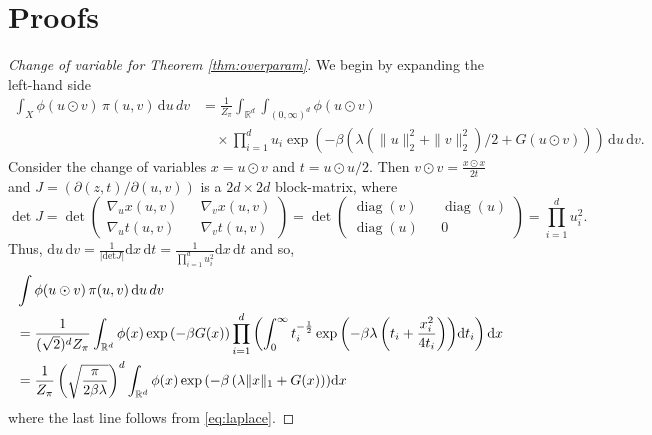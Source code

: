 \documentclass{article}
\DeclareMathOperator*{\diag}{diag}
\begin{document}
\section{Proofs}
\begin{proof}[Change of variable for Theorem \ref{thm:overparam}]
We begin by expanding the left-hand side
    \begin{align*}
    \int_X \phi(u \odot v) \,\pi(u,v)\,\mathrm{d}u\,dv &= \frac{1}{Z_\pi}  \int_{\mathbb{R}^d} \int_{(0,\infty)^d} \phi(u \odot v) \\
    &\quad\times\prod_{i=1}^d u_{i} \exp{ \left(-\beta \left(\lambda (\|u\|_2^2 + \|v\|_2^2)/2 + G(u \odot v) \right) \right)}\, \mathrm{d}u \,\mathrm{d}v.
    \end{align*}
    Consider the change of variables $x = u \odot v$ and $t = u \odot u/2$. Then $v \odot v = \frac{x \odot x}{2t}$ and $J = (\partial(z,t) / \partial(u,v))$ is a $2d \times 2d$ block-matrix, where
    $$\operatorname{det}J 
    = 
    \operatorname{det}\begin{pmatrix}
     \nabla_u x(u,v) && \nabla_v x(u,v) \\
     \nabla_u t(u,v) && \nabla_v t(u,v)
    \end{pmatrix} =\operatorname{det}\begin{pmatrix}
     \diag(v) && \diag(u) \\
     \diag(u) && 0
    \end{pmatrix} = \prod_{i=1}^d u_i^2.$$ 
    Thus, $\mathrm{d}u\,\mathrm{d}v = \frac{1}{|\mathrm{det}J|} \mathrm{d}
    x\,\mathrm{d}t = \frac{1}{\prod_{i=1}^d u_i^2} \mathrm{d}x\,\mathrm{d}t$ and so, 
    \begin{align*}   
    &\int \phi(u\odot v)\, \pi(u,v)\,\mathrm{d}u\,dv \\
       & = \frac{1}{(\sqrt{2})^d Z_\pi} \int_{\mathbb{R}^d} \phi(x) \exp{\left( -\beta G(x) \right)} \prod_{i=1}^d \left( \int_{0}^\infty t_i^{-\frac{1}{2}}\exp{ \left(-\beta \lambda \left(t_i + \frac{x_i^2}{4t_i} \right) \right)} \mathrm{d}t_i \right) \mathrm{d}x\\
       &= \frac{1}{Z_\pi} \left(\sqrt{\frac{\pi}{2\beta \lambda}}\right)^d \int_{\mathbb{R}^d} \phi(x) \exp{\left(-\beta \left(\lambda \|x\|_1 + G(x) \right) \right)}\mathrm{d}x
    \end{align*}
    where the last line follows from \eqref{eq:laplace}.
\end{proof}
\end{document}
